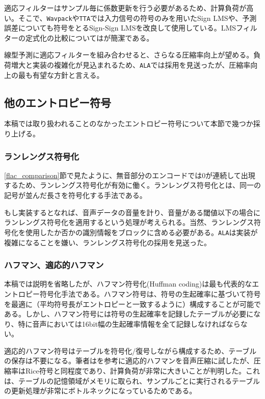 \documentclass[uplatex,dvipdfmx,b5j,10pt]{jsbook}
\theoremstyle{definition}
\begin{document}
適応フィルターはサンプル毎に係数更新を行う必要があるため、計算負荷が高い。そこで、\texttt{Wavpack}\cite{wavpack}や\texttt{TTA}\cite{tta}では入力信号の符号のみを用いたSign LMSや、予測誤差についても符号をとるSign-Sign LMSを改良して使用している。LMSフィルターの定式化の比較については\cite{adaptivefiltervariants}が簡潔である。

線型予測に適応フィルターを組み合わせると、さらなる圧縮率向上が望める。負荷増大と実装の複雑化が見込まれるため、\texttt{ALA}では採用を見送ったが、圧縮率向上の最も有望な方針と言える。

\subsection{他のエントロピー符号}

本稿では取り扱われることのなかったエントロピー符号について本節で幾つか採り上げる。

\subsubsection{ランレングス符号化}

\ref{flac_comparison}節で見たように、無音部分のエンコードでは0が連続して出現するため、ランレングス符号化が有効に働く。ランレングス符号化とは、同一の記号が並んだ長さを符号化する手法である。

もし実装するとなれば、音声データの音量を計り、音量がある閾値以下の場合にランレングス符号化を適用するという処理が考えられる。当然、ランレングス符号化を使用したか否かの識別情報をブロックに含める必要がある。\texttt{ALA}は実装が複雑になることを嫌い、ランレングス符号化の採用を見送った。

\subsubsection{ハフマン、適応的ハフマン}

本稿では説明を省略したが、ハフマン符号化(Huffman coding)は最も代表的なエントロピー符号化手法である。ハフマン符号は、符号の生起確率に基づいて符号を最適に（平均符号長がエントロピーと一致するように）構成することが可能である。しかし、ハフマン符号には符号の生起確率を記録したテーブルが必要になり、特に音声においては16bit幅の生起確率情報を全て記録しなければならない。

適応的ハフマン符号はテーブルを符号化/復号しながら構成するため、テーブルの保存は不要になる。筆者は\cite{textcompress, datacompresshandbook}を参考に適応的ハフマンを音声圧縮に試したが、圧縮率はRice符号と同程度であり、計算負荷が非常に大きいことが判明した。これは、テーブルの記憶領域がメモリに取られ、サンプルごとに実行されるテーブルの更新処理が非常にボトルネックになっているためである。
\end{document}
